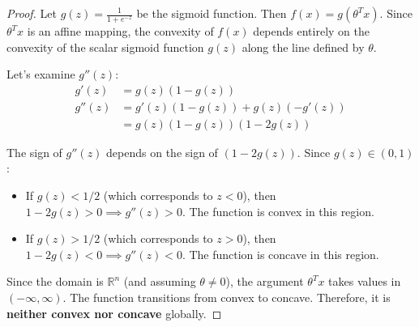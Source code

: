 \documentclass{article}
\begin{document}
\begin{proof}
Let $g(z) = \frac{1}{1+e^{-z}}$ be the sigmoid function. Then $f(x) = g(\theta^T x)$.
Since $\theta^T x$ is an affine mapping, the convexity of $f(x)$ depends entirely on the convexity of the scalar sigmoid function $g(z)$ along the line defined by $\theta$.

Let's examine $g''(z)$:
\begin{align*}
g'(z) &= g(z)(1 - g(z)) \\
g''(z) &= g'(z)(1 - g(z)) + g(z)(-g'(z)) \\
&= g(z)(1 - g(z))(1 - 2g(z))
\end{align*}

The sign of $g''(z)$ depends on the sign of $(1 - 2g(z))$.
Since $g(z) \in (0, 1)$:
\begin{itemize}
    \item If $g(z) < 1/2$ (which corresponds to $z < 0$), then $1 - 2g(z) > 0 \implies g''(z) > 0$. The function is convex in this region.
    \item If $g(z) > 1/2$ (which corresponds to $z > 0$), then $1 - 2g(z) < 0 \implies g''(z) < 0$. The function is concave in this region.
\end{itemize}

Since the domain is $\mathbb{R}^n$ (and assuming $\theta \neq 0$), the argument $\theta^T x$ takes values in $(-\infty, \infty)$. The function transitions from convex to concave. Therefore, it is \textbf{neither convex nor concave} globally.
\end{proof}
\end{document}

